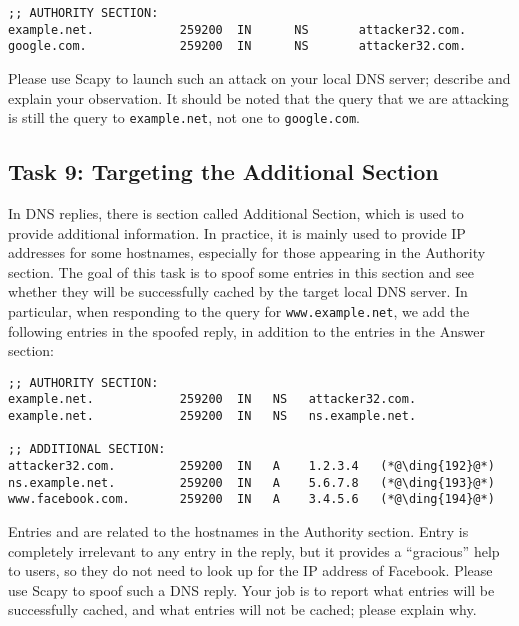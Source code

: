 \begin{lstlisting}
;; AUTHORITY SECTION:
example.net.            259200  IN      NS       attacker32.com.
google.com.             259200  IN      NS       attacker32.com.
\end{lstlisting}

Please use Scapy to launch such an attack on your local DNS server;
describe  and explain your observation. It should be noted that the query
that we are attacking is still the query to \texttt{example.net}, not one
to \texttt{google.com}.  



\subsection{Task 9: Targeting the Additional Section}

In DNS replies, there is section called Additional Section, which is used
to provide additional information. In practice, it is mainly used to
provide IP addresses for some hostnames, especially for those appearing in the
Authority section. The goal of this task is to spoof some entries 
in this section and see whether they will be successfully cached by the
target local DNS server. In particular, when responding to 
the query for \texttt{www.example.net}, we add the following entries 
in the spoofed reply, in addition to the entries in the Answer section:


\begin{lstlisting}
;; AUTHORITY SECTION:
example.net.            259200  IN   NS   attacker32.com.
example.net.            259200  IN   NS   ns.example.net.

;; ADDITIONAL SECTION:
attacker32.com.         259200  IN   A    1.2.3.4   (*@\ding{192}@*)
ns.example.net.         259200  IN   A    5.6.7.8   (*@\ding{193}@*)
www.facebook.com.       259200  IN   A    3.4.5.6   (*@\ding{194}@*)
\end{lstlisting}

Entries  and  are related to the hostnames in
the Authority section. Entry  is completely irrelevant to
any entry in the reply, but it provides a ``gracious'' help to
users, so they do not need to look up for the IP address
of Facebook. Please use Scapy to spoof such a DNS reply. Your job is
to report what entries will be successfully cached, and what entries will
not be cached; please explain why. 
 

